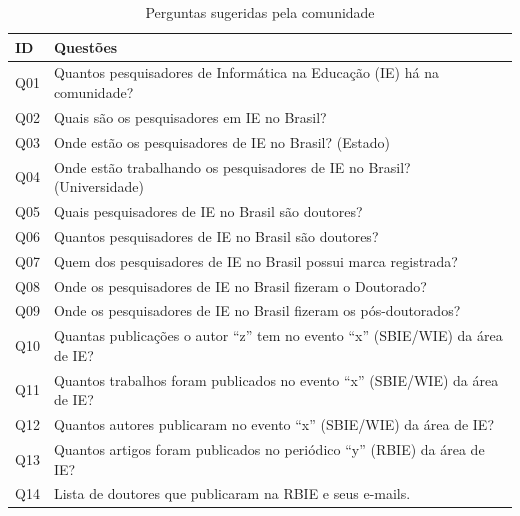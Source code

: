 \begin{table}[!ht]
	\centering
	\caption{Perguntas sugeridas pela comunidade}
	\label{tab:questions}
	\begin{tabular}{|l|l|}
		\hline
		\textbf{ID}  & \textbf{Questões}                                                                          \\ \hline
		Q01 & Quantos pesquisadores de Informática na Educação (IE) há na comunidade?                                                            \\ \hline
		Q02 & Quais são os pesquisadores em IE no Brasil?                                                              \\ \hline
		Q03 & Onde estão os pesquisadores de IE no Brasil? (Estado)                                                              \\ \hline
		Q04 & Onde estão trabalhando os pesquisadores de IE no Brasil? (Universidade)                                                        \\ \hline
		Q05 & Quais pesquisadores de IE no Brasil são doutores?                                                               \\ \hline
		Q06 & Quantos pesquisadores de IE no Brasil são doutores?                                                             \\ \hline
		Q07 & Quem dos pesquisadores de IE no Brasil possui marca registrada?                                                                \\ \hline
		Q08 & Onde os pesquisadores de IE no Brasil fizeram o Doutorado?                                                \\ \hline
		Q09 & Onde os pesquisadores de IE no Brasil fizeram os pós-doutorados?                                            \\ \hline
		Q10 & Quantas publicações o autor “z” tem no evento “x” (SBIE/WIE) da área de IE?                                \\ \hline
		Q11 & Quantos trabalhos foram publicados no evento “x” (SBIE/WIE) da área de IE?                                 \\ \hline
		Q12 & Quantos autores publicaram no evento “x” (SBIE/WIE) da área de IE?                                         \\ \hline
		Q13 & Quantos artigos foram publicados no periódico “y” (RBIE) da área de IE?                                \\ \hline
		Q14 & Lista de doutores que publicaram na RBIE e seus e-mails.                                                  \\ \hline

\end{tabular}
\end{table}
